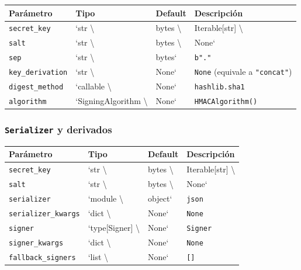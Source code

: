 \documentclass[11pt,a4paper]{article}
\begin{document}
\begin{center}
\begin{tabular}{@{}llll@{}}
\toprule
Parámetro & Tipo & Default & Descripción \\
\midrule
\texttt{secret\_key} & `str \textbackslash{} & bytes \textbackslash{} & Iterable[str] \textbackslash{} \\
\texttt{salt} & `str \textbackslash{} & bytes \textbackslash{} & None` \\
\texttt{sep} & `str \textbackslash{} & bytes` & \texttt{b"."} \\
\texttt{key\_derivation} & `str \textbackslash{} & None` & \texttt{None} (equivale a \texttt{"concat"}) \\
\texttt{digest\_method} & `callable \textbackslash{} & None` & \texttt{hashlib.sha1} \\
\texttt{algorithm} & `SigningAlgorithm \textbackslash{} & None` & \texttt{HMACAlgorithm()} \\
\bottomrule
\end{tabular}
\end{center}



\subsubsection*{\texttt{Serializer} y derivados}


\begin{center}
\begin{tabular}{@{}llll@{}}
\toprule
Parámetro & Tipo & Default & Descripción \\
\midrule
\texttt{secret\_key} & `str \textbackslash{} & bytes \textbackslash{} & Iterable[str] \textbackslash{} \\
\texttt{salt} & `str \textbackslash{} & bytes \textbackslash{} & None` \\
\texttt{serializer} & `module \textbackslash{} & object` & \texttt{json} \\
\texttt{serializer\_kwargs} & `dict \textbackslash{} & None` & \texttt{None} \\
\texttt{signer} & `type[Signer] \textbackslash{} & None` & \texttt{Signer} \\
\texttt{signer\_kwargs} & `dict \textbackslash{} & None` & \texttt{None} \\
\texttt{fallback\_signers} & `list \textbackslash{} & None` & \texttt{[]} \\
\bottomrule
\end{tabular}
\end{center}
\end{document}
